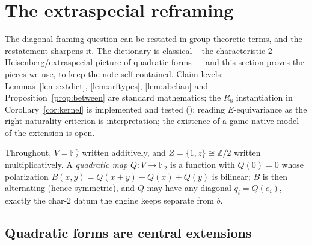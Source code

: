 \documentclass[11pt]{article}
\theoremstyle{plain}
\theoremstyle{definition}
\newcommand{\F}{\mathbb{F}}
\begin{document}
\section{The extraspecial reframing}\label{sec:extraspecial}

The diagonal-framing question can be restated in group-theoretic terms, and
the restatement sharpens it. The dictionary is classical -- the
characteristic-$2$ Heisenberg/extraspecial picture of quadratic
forms~\cite{Quillen71,Gorenstein80} -- and this section proves the pieces we
use, to keep the note self-contained. Claim levels: Lemmas~\ref{lem:extdict},
\ref{lem:arftypes}, \ref{lem:abelian} and
Proposition~\ref{prop:between} are standard mathematics; the $R_8$
instantiation in Corollary~\ref{cor:kernel} is implemented and tested
(); reading $E$-equivariance as the right
naturality criterion is interpretation; the existence of a game-native model
of the extension is open.

Throughout, $V=\F_2^n$ written additively, and $Z=\{1,z\}\cong\mathbb{Z}/2$
written multiplicatively. A \emph{quadratic map} $Q\colon V\to\F_2$ is a
function with $Q(0)=0$ whose polarization
$B(x,y)=Q(x+y)+Q(x)+Q(y)$ is bilinear; $B$ is then alternating (hence
symmetric), and $Q$ may have any diagonal $q_i=Q(e_i)$, exactly the
char-$2$ datum the engine keeps separate from $b$.

\subsection{Quadratic forms are central extensions}
\end{document}
